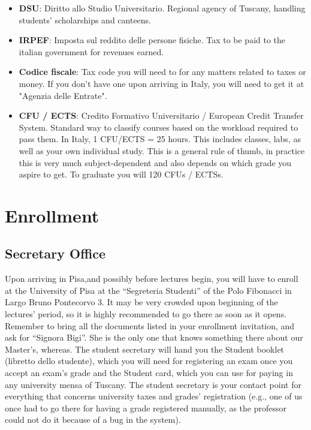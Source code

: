 \documentclass[11pt,fleqn,oneside]{book} %
\begin{document}
\begin{itemize}

	\item \textbf{DSU}: Diritto allo Studio Universitario. Regional agency of Tuscany, handling students' scholarships and canteens. 
	\item \textbf{IRPEF}: Imposta sul reddito delle persone fisiche. Tax to be paid to the italian government for revenues earned. 
	\item \textbf{Codice fiscale}: Tax code you will need to for any matters related to taxes or money. If you don't have one upon arriving in Italy, you will need to get it at "Agenzia delle Entrate". 
	
	\item \textbf{CFU / ECTS}: Credito Formativo Universitario / European Credit Transfer System. Standard way to classify courses based on the workload required to pass them. In Italy, 1 CFU/ECTS  = 25 hours. This includes classes, labs, as well as your own individual study. This is a general rule of thumb, in practice this is very much subject-dependent and also depends on which grade you aspire to get. To graduate you will 120 CFUs / ECTSs. 
\end{itemize}



\chapter{Enrollment}


\section{Secretary Office}

Upon arriving in Pisa,and possibly before lectures begin, you will have to enroll at the University of Pisa at the “Segreteria Studenti” of the Polo Fibonacci in Largo Bruno Pontecorvo 3. It may be very crowded upon beginning of the lectures’ period, so it is highly recommended to go there as soon as it opens. Remember to bring all the documents listed in your enrollment invitation, and ask for “Signora Bigi”. She is the only one that knows something there about our Master’s, whereas.
The student secretary will hand you the Student booklet (libretto dello studente), which you will need for registering an exam once you accept an exam’s grade and the Student card, which you can use for paying in any university mensa of Tuscany. The student secretary is your contact point for everything that concerns university taxes and grades’ registration (e.g., one of us once had to go there for having a grade registered manually, as the professor could not do it because of a bug in the system). 
\end{document}
